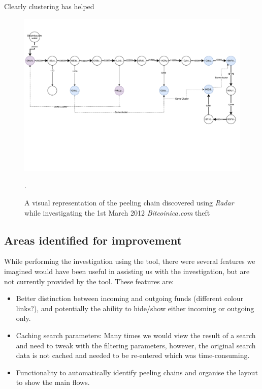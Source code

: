 Clearly clustering has helped 
\begin{figure}[h!]
  \centering
  \includegraphics[width = 15cm]{./figures/bitcoinicapeelingchain}\\[0.5cm]
  \caption{A visual representation of the peeling chain discovered using \textit{Radar} while investigating the 1st March 2012 \textit{Bitcoinica.com} theft}.
  \label{fig:bitcoinica-peel-chain}
\end{figure}

\subsection{Areas identified for improvement}
While performing the investigation using the tool, there were several features we imagined would have been useful in assisting us with the investigation, but are not currently provided by the tool. These features are:
\begin{itemize}
    \item Better distinction between incoming and outgoing funds (different colour links?), and potentially the ability to hide/show either incoming or outgoing only.
    \item Caching search parameters: Many times we would view the result of a search and need to tweak with the filtering parameters, however, the original search data is not cached and needed to be re-entered which was time-consuming.
    \item Functionality to automatically identify peeling chains and organise the layout to show the main flows. 
\end{itemize}

